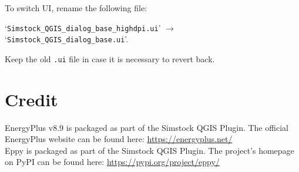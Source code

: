 \documentclass{article}
\begin{document}
To switch UI, rename the following file:
\begin{center}
`\texttt{Simstock\_QGIS\_dialog\_base\_highdpi.ui}' \hspace{2mm} $\rightarrow$ \hspace{2mm} `\texttt{Simstock\_QGIS\_dialog\_base.ui}'.
\end{center}
Keep the old \texttt{.ui} file in case it is necessary to revert back.

\section{Credit}
EnergyPlus v8.9 is packaged as part of the Simstock QGIS Plugin. The official EnergyPlus website can be found here: \url{https://energyplus.net/} \\

Eppy is packaged as part of the Simstock QGIS Plugin. The project's homepage on PyPI can be found here: \url{https://pypi.org/project/eppy/}

\end{document}
